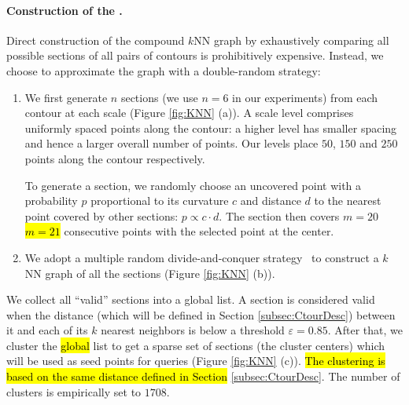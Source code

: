 \paragraph*{Construction of the {\RCKNNG}.} Direct construction of the compound $k$NN graph by exhaustively comparing all possible sections of all pairs of contours is prohibitively expensive. Instead, we choose to approximate the graph with a double-random strategy:
%
\begin{enumerate}
  \item We first generate $n$ sections (we use $n=6$ in our experiments) from each contour at each scale (Figure \ref{fig:KNN} (a)). A scale level comprises uniformly spaced points along the contour: a higher level has smaller spacing and hence a larger overall number of points. Our levels place $50$, $150$ and $250$ points along the contour respectively.

To generate a section, we randomly choose an uncovered point with a probability $p$ proportional to its curvature $c$ and distance $d$ to the nearest point covered by other sections: $p \propto c \cdot d$. The section then covers \st{$m = 20$} \hl{$m = 21$} consecutive points with the selected point at the center.

  \item We adopt a multiple random divide-and-conquer strategy~\cite{scalableknnjingwangcvpr2012} to construct a $k$NN graph of all the sections (Figure \ref{fig:KNN} (b)).
\end{enumerate}
%
We collect all ``valid'' sections into a global list. A section is considered valid when the distance (which will be defined in Section \ref{subsec:CtourDesc}) between it and each of its $k$ nearest neighbors is below a threshold $\varepsilon=0.85$. After that, we cluster the \hl{global} list to get a sparse set of sections (the cluster centers) which will be used as seed points for queries (Figure \ref{fig:KNN} (c)). \hl{The clustering is based on the same distance defined in Section } \ref{subsec:CtourDesc}. The number of clusters is empirically set to $1708$.
%
